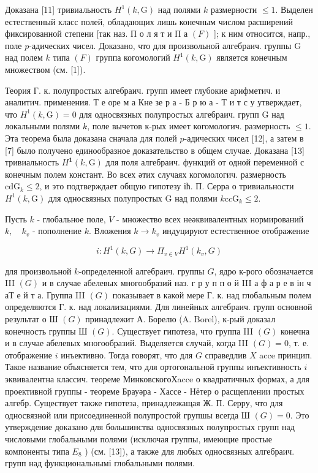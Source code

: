 \documentclass[10pt]{article}
\begin{document}
Доказана [11] тривиальность $H^{1}(k, \mathrm{G})$ над полями $k$ размерности $\leqslant 1$. Выделен естественный класс полей, обладающих лишь конечным числом расширений фиксированной степени [так наз. П о л я т и П а $(F)$ ]; к ним относится, напр., поле $p$-адических чисел. Доказано, что для произвольной алгебраич. группы $\mathrm{G}$ над полем $k$ типа $(F)$ группа когомологий $H^{1}(k, \mathrm{G})$ является конечным множеством (см. [1]).



Теория Г. к. полупростых алгебраич. групп имеет глубокие арифметич. и аналитич. применения. Т е оре м а Кне зе р а - Б р ю а - Т и т с у утверждает, что $H^{1}(k, \mathrm{G})=0$ для односвязных полупростых алгебраич. групп $\mathrm{G}$ над локальными полями $k$, поле вычетов к-рых имеет когомологич. размерность $\leqslant 1$. Эта теорема была доказана сначала для полей $p$-адических чисел [12], а затем в [7] было получено единообразное доказательство в общем случае. Доказана [13] тривиальность $H^{\mathbf{1}}(k, \mathrm{G})$ для поля алгебраич. функций от одной переменной с конечным полем констант. Во всех әтих случаях когомологич. размерность $\mathrm{cdG}_{k} \leqslant 2$, и это подтверждает общую гипотезу іћ. П. Серра о тривиальности $H^{1}(k, \mathrm{G})$ для односвязных полупростых $\mathrm{G}$ над полями $k \mathrm{c} c \mathrm{G}_{k} \leqslant 2$.



Пусть $k$ - глобальное поле, $V$ - множество всех неәквивалентных нормирований $k, \quad k_{v}$ - пополнение $k$. Вложения $k \rightarrow k_{v}$ индуцируют естественное отображение



\[

i: H^{1}(k, G) \rightarrow \Pi_{v \in V} H^{1}\left(k_{v}, G\right)

\]



для произвольной $k$-определенной алгебраич. группы $G$, ядро к-рого обозначается III $(G)$ и в случае абелевых многообразий наз. г р у п п о й III а ф а р е в ін ч аТ е й т а. Группа III $(G)$ показывает в какой мере Г. к. над глобальным полем определяются Г. к. над локализациями. Для линейных алгебраич. групп основной результат о Ш $(G)$ принадлежит А. Борелю (A. Borel), к-рый доказал конечность группы Ш $(G)$. Существует гипотеза, что группа III $(G)$ конечна и в случае абелевых многообразий. Выделяется случай, когда III $(G)=0$, т. е. отображение $i$ инъективно. Тогда говорят, что для $G$ справедлив $X$ acce принцип. Такое название объясняется тем, что для ортогональной группы инъективность $i$ эквивалентна классич. теореме МинковскогоХacce о квадратичных формах, а для проективной группы - теореме Брауәра - Хассе - Нётер о расщеплении простых алгебр. Существует также гипотеза, принадлежащая Ж. П. Серру, что для односвязной или присоединенной полупростой групшы всегда Ш $(G)=0$. Это утверждение доказано для большинства односвязных полупростых групп над числовыми глобальными полями (исключая группы, имеющие простые компоненты типа $E_{8}$ ) (см. [13]), а также для любых односвязных алгебраич. групп над функциональнымі глобальными полями.
\end{document}
